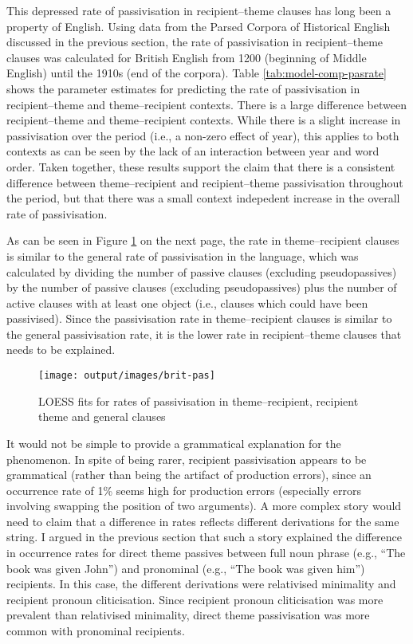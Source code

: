 	This depressed rate of passivisation in recipient--theme clauses has long been a property of English. Using data from the Parsed Corpora of Historical English discussed in the previous section, the rate of passivisation in recipient--theme clauses was calculated for British English from 1200 (beginning of Middle English) until the 1910s (end of the corpora). Table \ref{tab:model-comp-pasrate} shows the parameter estimates for predicting the rate of passivisation in recipient--theme and theme--recipient contexts. There is a large difference between recipient--theme and theme--recipient contexts. While there is a slight increase in passivisation over the period (i.e., a non-zero effect of year), this applies to both contexts as can be seen by the lack of an interaction between year and word order. Taken together, these results support the claim that there is a consistent difference between theme--recipient and recipient--theme passivisation throughout the period, but that there was a small context indepedent  increase in the overall rate of passivisation.

	

	 As can be seen in Figure \ref{fig:brit-pas} on the next page, the rate in theme--recipient clauses is similar to the general rate of passivisation in the language, which was calculated by dividing the number of passive clauses (excluding pseudopassives) by the number of passive clauses (excluding pseudopassives) plus the number of active clauses with at least one object (i.e., clauses which could have been passivised). Since the passivisation rate in theme--recipient clauses is similar to the general passivisation rate, it is the lower rate in recipient--theme clauses that needs to be explained.

	\begin{figure}[ht!]
		\texttt{[image: output/images/brit-pas]}
		\caption{LOESS fits for rates of passivisation in theme--recipient, recipient theme and general clauses}
		\label{fig:brit-pas}
	\end{figure}

	It would not be simple to provide a grammatical explanation for the phenomenon. In spite of being rarer, recipient passivisation appears to be grammatical (rather than being the artifact of production errors), since an occurrence rate of 1\% seems high for production errors (especially errors involving swapping the position of two arguments). A more complex story would need to claim that a difference in rates reflects different derivations for the same string. I argued in the previous section that such a story explained the difference in occurrence rates for direct theme passives between full noun phrase (e.g., ``The book was given John'') and pronominal (e.g., ``The book was given him'') recipients. In this case, the different derivations were relativised minimality and recipient pronoun cliticisation. Since recipient pronoun cliticisation was more prevalent than relativised minimality, direct theme passivisation was more common with pronominal recipients.
	
